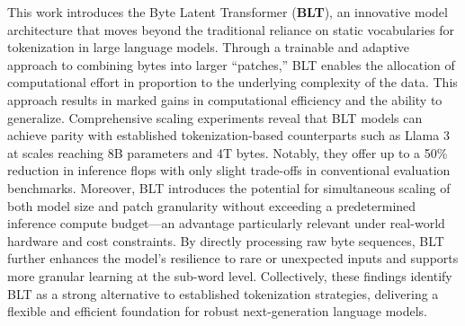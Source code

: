 This work introduces the Byte Latent Transformer (\textbf{BLT}), an innovative model architecture that moves beyond the traditional reliance on static vocabularies for tokenization in large language models. Through a trainable and adaptive approach to combining bytes into larger “patches,” {\textsc BLT} enables the allocation of computational effort in proportion to the underlying complexity of the data. This approach results in marked gains in computational efficiency and the ability to generalize. Comprehensive scaling experiments reveal that {\textsc BLT} models can achieve parity with established tokenization-based counterparts such as Llama 3 at scales reaching 8B parameters and 4T bytes. Notably, they offer up to a 50\% reduction in inference flops with only slight trade-offs in conventional evaluation benchmarks. Moreover, {\textsc BLT} introduces the potential for simultaneous scaling of both model size and patch granularity without exceeding a predetermined inference compute budget—an advantage particularly relevant under real-world hardware and cost constraints. By directly processing raw byte sequences, {\textsc BLT} further enhances the model’s resilience to rare or unexpected inputs and supports more granular learning at the sub-word level. Collectively, these findings identify {\textsc BLT} as a strong alternative to established tokenization strategies, delivering a flexible and efficient foundation for robust next-generation language models.

